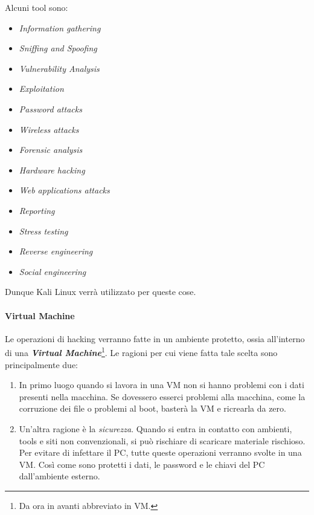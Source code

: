 \documentclass[14pt]{extreport}
\begin{document}
Alcuni tool sono:

\begin{itemize}
    \item \textit{Information gathering}
    \item \textit{Sniffing and Spoofing}
    \item \textit{Vulnerability Analysis}
    \item \textit{Exploitation}
    \item \textit{Password attacks}
    \item \textit{Wireless attacks}
    \item \textit{Forensic analysis}
    \item \textit{Hardware hacking}
    \item \textit{Web applications attacks}
    \item \textit{Reporting}
    \item \textit{Stress testing}
    \item \textit{Reverse engineering}
    \item \textit{Social engineering}
\end{itemize}

Dunque Kali Linux verrà utilizzato per queste cose.

\paragraph{Virtual Machine}
Le operazioni di hacking verranno fatte in un ambiente protetto, ossia all'interno di una \textit{\textbf{Virtual Machine}}\footnote{Da ora in avanti abbreviato in VM.}. Le ragioni per cui viene fatta tale scelta sono principalmente due:

\begin{enumerate}
    \item In primo luogo quando si lavora in una VM non si hanno problemi con i dati presenti nella macchina. Se dovessero esserci problemi alla macchina, come la corruzione dei file o problemi al boot, basterà  la VM e ricrearla da zero.
    \item Un'altra ragione è la \textit{sicurezza}. Quando si entra in contatto con ambienti, tools e siti non convenzionali, si può rischiare di scaricare materiale rischioso. Per evitare di infettare il PC, tutte queste operazioni verranno svolte in una VM. Così come sono protetti i dati, le password e le chiavi del PC dall'ambiente esterno.
\end{enumerate}
\end{document}
